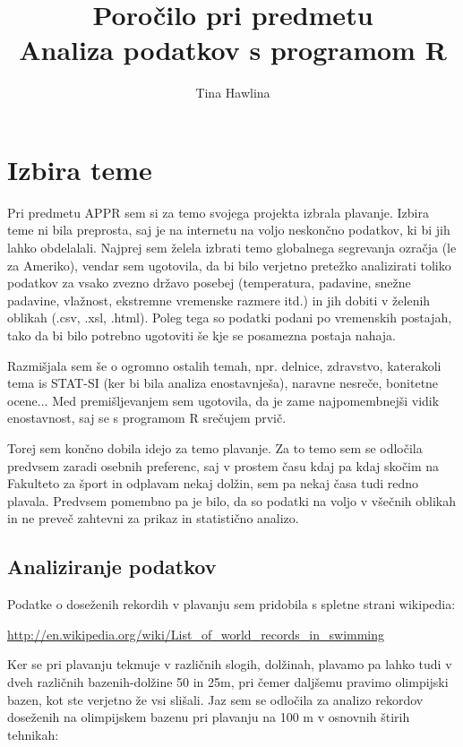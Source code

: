 \documentclass[11pt,a4paper]{article}
\begin{document}
\title{Poročilo pri predmetu \\
Analiza podatkov s programom R}
\author{Tina Hawlina}
\maketitle

\section{Izbira teme}

Pri predmetu APPR sem si za temo svojega projekta izbrala plavanje. Izbira teme ni bila preprosta, saj je na internetu na voljo neskončno podatkov, ki bi jih lahko obdelalali. Najprej sem želela izbrati temo globalnega segrevanja ozračja (le za Ameriko), vendar sem ugotovila, da bi bilo verjetno pretežko analizirati toliko podatkov za vsako zvezno državo posebej (temperatura, padavine, snežne padavine, vlažnost, ekstremne vremenske razmere itd.) in jih dobiti v želenih oblikah (.csv, .xsl, .html). Poleg tega so podatki podani po vremenskih postajah, tako da bi bilo potrebno ugotoviti še kje se posamezna postaja nahaja.

Razmišjala sem še o ogromno ostalih temah, npr. delnice, zdravstvo, katerakoli tema is STAT-SI (ker bi bila analiza enostavnješa), naravne nesreče, bonitetne ocene... Med premišljevanjem sem ugotovila, da je zame najpomembnejši vidik enostavnost, saj se s programom R srečujem prvič.

Torej sem končno dobila idejo za temo plavanje. Za to temo sem se odločila predvsem zaradi osebnih preferenc, saj v prostem času kdaj pa kdaj skočim na Fakulteto za šport in odplavam nekaj dolžin, sem pa nekaj časa tudi redno plavala. Predvsem pomembno pa je bilo, da so podatki na voljo v všečnih oblikah in ne preveč zahtevni za prikaz in statistično analizo. 


\subsection{Analiziranje podatkov}

Podatke o doseženih rekordih v plavanju sem pridobila s spletne strani wikipedia:

\url {http://en.wikipedia.org/wiki/List_of_world_records_in_swimming}

Ker se pri plavanju tekmuje v različnih slogih, dolžinah, plavamo pa lahko tudi v dveh različnih bazenih-dolžine 50 in 25m, pri čemer daljšemu pravimo olimpijski bazen, kot ste verjetno že vsi slišali. Jaz sem se odločila za analizo rekordov doseženih na olimpijskem bazenu pri plavanju na 100 m  v osnovnih štirih tehnikah:
\end{document}
